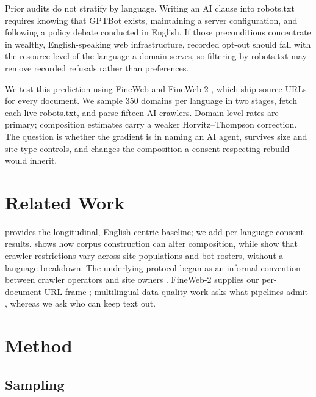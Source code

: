 \documentclass[11pt]{article}
\begin{document}
Prior audits do not stratify by language. Writing an AI clause into robots.txt requires knowing that GPTBot exists, maintaining a server configuration, and following a policy debate conducted in English. If those preconditions concentrate in wealthy, English-speaking web infrastructure, recorded opt-out should fall with the resource level of the language a domain serves, so filtering by robots.txt may remove recorded refusals rather than preferences.

We test this prediction using FineWeb \citep{penedo2024fineweb} and FineWeb-2 \citep{penedo2025fineweb2}, which ship source URLs for every document. We sample 350 domains per language in two stages, fetch each live robots.txt, and parse fifteen AI crawlers. Domain-level rates are primary; composition estimates carry a weaker Horvitz--Thompson correction. The question is whether the gradient is in naming an AI agent, survives size and site-type controls, and changes the composition a consent-respecting rebuild would inherit.

\section{Related Work}

\citet{longpre2024consent} provides the longitudinal, English-centric baseline; we add per-language consent results. \citet{dodge2021documenting} shows how corpus construction can alter composition, while \citet{steinacker2025misinformation,cui2025odyssey} show that crawler restrictions vary across site populations and bot rosters, without a language breakdown. The underlying protocol began as an informal convention between crawler operators and site owners \citep{koster1994standard}. FineWeb-2 supplies our per-document URL frame \citep{penedo2025fineweb2}; multilingual data-quality work asks what pipelines admit \citep{kreutzer2022quality,caswell2020langid}, whereas we ask who can keep text out.

\section{Method}

\subsection{Sampling}
\end{document}
